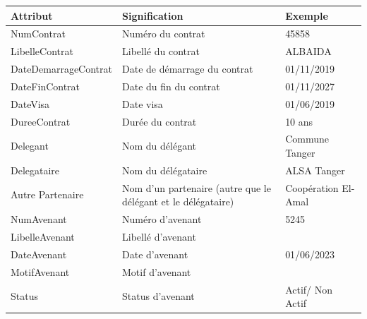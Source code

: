 \documentclass[a4paper]{report}
\begin{document}
\begin{doublespace}
	\begin{table}[H]
		\begin{center}
			\begin{tabularx}{17.5cm}{|p{3.5cm}|X|p{3.5cm}|}
				\hline
				\textbf{Attribut}    & \textbf{Signification}                                        & \textbf{Exemple}    \\
				\hline
				NumContrat           & Numéro du contrat                                             & 45858               \\
				\hline
				LibelleContrat       & Libellé du contrat                                            & ALBAIDA             \\
				\hline
				DateDemarrageContrat & Date de démarrage du contrat                                  & 01/11/2019          \\
				\hline
				DateFinContrat       & Date du fin du contrat                                        & 01/11/2027          \\
				\hline
				DateVisa             & Date visa                                                     & 01/06/2019          \\
				\hline
				DureeContrat         & Durée du contrat                                              & 10 ans              \\
				\hline
				Delegant             & Nom du délégant                                               & Commune Tanger      \\
				\hline
				Delegataire          & Nom du délégataire                                            & ALSA Tanger         \\
				\hline
				Autre Partenaire     & Nom d'un partenaire (autre que le délégant et le délégataire) & Coopération El-Amal \\
				\hline
				NumAvenant           & Numéro d'avenant                                              & 5245                \\
				\hline
				LibelleAvenant       & Libellé d'avenant                                             &                     \\
				\hline
				DateAvenant          & Date d'avenant                                                & 01/06/2023          \\
				\hline
				MotifAvenant         & Motif d'avenant                                               &                     \\
				\hline
				Status               & Status d'avenant                                              & Actif/ Non Actif    \\

\end{tabularx}
\end{center}
\end{table}
\end{doublespace}
\end{document}
